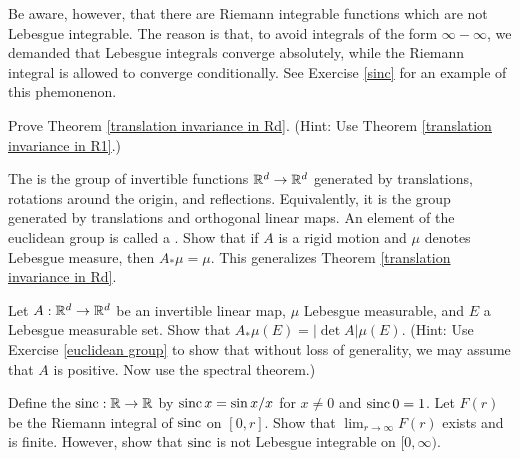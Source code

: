 Be aware, however, that there are Riemann integrable functions which are not Lebesgue integrable.
The reason is that, to avoid integrals of the form $\infty - \infty$, we demanded that Lebesgue integrals converge absolutely, while the Riemann integral is allowed to converge conditionally.
See Exercise \ref{sinc} for an example of this phemonenon.

\begin{exercise}
\label{translation invariance exer}
Prove Theorem \ref{translation invariance in Rd}. (Hint: Use Theorem \ref{translation invariance in R1}.)
\end{exercise}

\begin{exercise}
\label{euclidean group}
The  is the group of invertible functions $\mathbb{R}^{d} \to \mathbb{R}^d$ generated by translations, rotations around the origin, and reflections. Equivalently, it is the group generated by translations and orthogonal linear maps.
An element of the euclidean group is called a . Show that if $A$ is a rigid motion and $\mu$ denotes Lebesgue measure, then $A_*\mu = \mu$.
This generalizes Theorem \ref{translation invariance in Rd}.
\end{exercise}

\begin{exercise}
Let $A: \mathbb{R}^{d} \to \mathbb{R}^d$ be an invertible linear map, $\mu$ Lebesgue measurable, and $E$ a Lebesgue measurable set. Show that $A_*\mu(E) = |\det A|\mu(E)$.
(Hint: Use Exercise \ref{euclidean group} to show that without loss of generality, we may assume that $A$ is positive. Now use the spectral theorem.)
\end{exercise}

\begin{exercise}
\label{sinc}
Define the  $\operatorname{sinc}: \mathbb{R} \to \mathbb{R}$ by $\operatorname{sinc} x = \sin x/x$ for $x \neq 0$ and $\operatorname{sinc} 0 = 1$.
Let $F(r)$ be the Riemann integral of $\operatorname{sinc}$ on $[0, r]$. Show that $\lim_{r \to \infty} F(r)$ exists and is finite.
However, show that $\operatorname{sinc}$ is not Lebesgue integrable on $[0, \infty)$.
\end{exercise}

